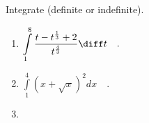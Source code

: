 Integrate (definite or indefinite).
\begin{enumerate}
\item $\displaystyle\int\limits_{1}^{8} \frac{t-t^{\frac{1}{3}}+ 2}{ t^{\frac{4}{3}}} \diff t\quad .$

\item $\displaystyle\int\limits_{1}^{4} \left(x+\sqrt{x}\right)^2 dx\quad .$

\item 

\end{enumerate}
